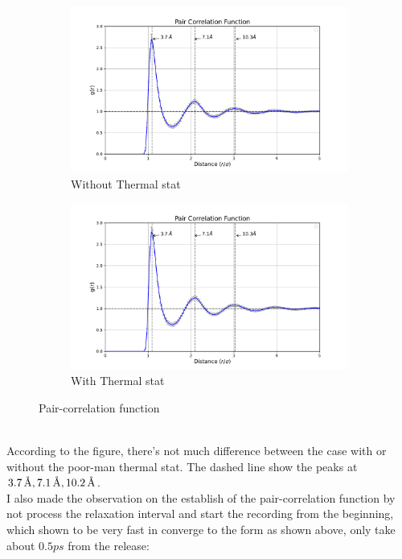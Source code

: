 \documentclass[a4paper]{article}
\begin{document}
\begin{figure}[!h]
\centering
\captionsetup{justification=centering}
\hfill
\begin{subfigure}{0.4\linewidth}
	\includegraphics[width=\textwidth]{Images/grnopm.pdf}
	\caption{Without Thermal stat}
	\label{nopmgr}
\end{subfigure}
\hfill
\begin{subfigure}{0.4\linewidth}
	\includegraphics[width=\textwidth]{Images/grpmtr=2.pdf}
	\caption{With Thermal stat}
	\label{pmgr}
\end{subfigure}
\caption{Pair-correlation function}
\label{fig:gr}
\end{figure}\\\null
\quad According to the figure, there's not much difference between the case with or without the poor-man thermal stat. The dashed line show the peaks at \(3.7\,\text{\r{A}}, 7.1\,\text{\r{A}}, 10.2\,\text{\r{A}}\).\\
\quad I also made the observation on the establish of the pair-correlation function by not process the relaxation interval and start the recording from the beginning, which shown to be very fast in converge to the form as shown above, only take about \(0.5 ps\) from the release:
\end{document}
